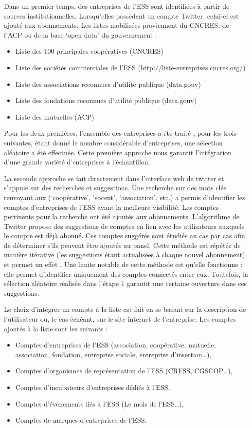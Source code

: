 Dans un premier temps, des entreprises de l’ESS sont identifiées à partir de sources institutionnelles. Lorsqu’elles possèdent un compte Twitter, celui-ci est ajouté aux abonnements. Les listes mobilisées proviennent du CNCRES, de l’ACP ou de la base ‘open data’ du gouvernement :
\begin{itemize}
    \item Liste des 100 principales coopératives (CNCRES)
    \item Liste des sociétés commerciales de l’ESS (\url{http://liste-entreprises.cncres.org/})
    \item Liste des associations reconnues d’utilité publique (data.gouv)
    \item Liste des fondations reconnues d’utilité publique (data.gouv)
    \item Liste des mutuelles (ACP)
\end{itemize}

Pour les deux premières, l’ensemble des entreprises a été traité ; pour les trois suivantes, étant donné le nombre considérable d’entreprises, une sélection aléatoire a été effectuée. Cette première approche nous garantit l’intégration d’une grande variété d’entreprises à l’échantillon.

La seconde approche se fait directement dans l’interface web de twitter et s’appuie sur des recherches et suggestions. Une recherche sur des mots clés renvoyant aux \eess (‘coopérative’, ‘socent’, ‘association’, etc.) a permis d’identifier les comptes d’entreprises de l’ESS ayant la meilleure visibilité. Les comptes pertinents pour la recherche ont été ajoutés aux abonnements. L’algorithme de Twitter propose des suggestions de comptes en lien avec les utilisateurs auxquels le compte est déjà abonné. Ces comptes suggérés sont étudiés au cas par cas afin de déterminer s’ils peuvent être ajoutés au panel. Cette méthode est répétée de manière itérative (les suggestions étant actualisées à chaque nouvel abonnement) et permet un effet . Une limite notable de cette méthode est qu’elle fonctionne  : elle permet d’identifier uniquement des comptes connectés entre eux. Toutefois, la sélection aléatoire réalisée dans l’étape 1 garantit une certaine ouverture dans ces suggestions.

Le choix d’intégrer un compte à la liste est fait en se basant sur la description de l’utilisateur ou, le cas échéant, sur le site internet de l’entreprise. Les comptes ajoutés à la liste sont les suivants :
\begin{itemize}
    \item Comptes d’entreprises de l’ESS (association, coopérative, mutuelle, association, fondation, entreprise sociale, entreprise d’insertion…),
    \item Comptes d’organismes de représentation de l’ESS (CRESS, CGSCOP…),
    \item Comptes d’incubateurs d’entreprises dédiés à l’ESS,
    \item Comptes d’évènements liés à l’ESS (Le mois de l’ESS…),
    \item Comptes de marques d’entreprises de l’ESS.
\end{itemize}


